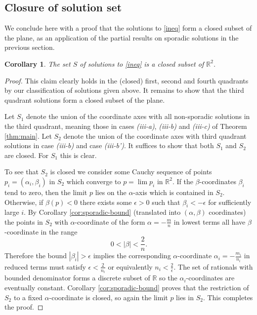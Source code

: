 \documentclass[12pt,letterpaper, reqno]{amsart}
\newtheorem{cor}[thm]{Corollary}
\theoremstyle{definition}
\theoremstyle{remark}
\newcommand{\RR}{\ensuremath{\mathbb{R}}}
\begin{document}


\subsection{Closure of solution set}\label{sec:93}
We conclude here with a proof that the solutions to \eqref{ineq} form a closed subset of the plane, as an application of the partial results on sporadic solutions in the previous section.

\begin{cor}
The set $S$ of solutions to \eqref{ineq} is a closed subset of $\RR^2$.
\end{cor}
\begin{proof}
This claim clearly holds in the (closed) first, second and fourth quadrants by our classification of solutions given above. It remains to show that the third quadrant solutions form a closed subset of the plane.

Let $S_1$ denote the union of the coordinate axes with all non-sporadic solutions in the third quadrant, meaning those in cases {\it(iii-a)}, {\it(iii-b)} and {\it(iii-c)} of Theorem \ref{thm:main}. Let $S_2$ denote the union of the coordinate axes with third quadrant solutions in case {\it(iii-b)} and case {\it(iii-b')}. It suffices to show that both $S_1$ and $S_2$ are closed. For $S_1$ this is clear.

To see that $S_2$ is closed we consider some Cauchy sequence of points $p_i = (\alpha_i,\beta_i)$ in $S_2$ which converge to $p = \lim p_i$ in $\RR^2$. If the $\beta$-coordinates $\beta_i$ tend to zero, then the limit $p$ lies on the $\alpha$-axis which is contained in $S_2$. Otherwise, if $\beta(p) <0$ there exists some $\epsilon >0$ such that $\beta_i < -\epsilon$ for sufficiently large $i$. 
By Corollary \ref{cor:sporadic-bound} (translated into $(\alpha,\beta)$ coordinates) 
the points in $S_2$ with $\alpha$-coordinate of the form
$ \alpha = -\frac{m}{n}$
in lowest terms
all have $\beta$-coordinate in the range
\[ 0 < |\beta| < \frac2{n}. \]
Therefore the bound $|\beta_i| > \epsilon$ implies the corresponding $\alpha$-coordinate 
$\alpha_i = -\frac{m_i}{n_i}$
in reduced terms must satisfy
$  \epsilon < \frac2{n_i}$
or equivalently $n_i < \frac{2}{\epsilon}$. The set of rationals with bounded denominator forms a discrete subset of $\RR$ so the $\alpha_i$-coordinates are eventually constant. Corollary \ref{cor:sporadic-bound} proves that the restriction of $S_2$ to a fixed $\alpha$-coordinate is closed, so again the limit $p$ lies in $S_2$. This completes the proof.
\end{proof}
\end{document}
